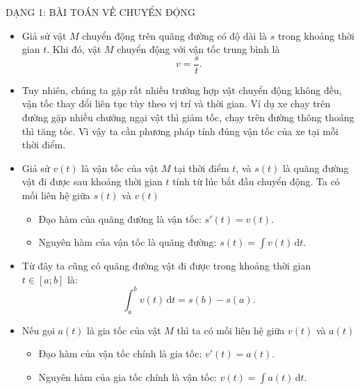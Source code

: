 \documentclass[12pt,a4paper]{article}
\newcommand{\dd}{\,\mathrm{d}}
\begin{document}
\begin{dangbox}DẠNG 1: BÀI TOÁN VỀ CHUYỂN ĐỘNG\end{dangbox}

\begin{itemize}
\item Giả sử vật $M$ chuyển động trên quãng đường có độ dài là $s$ trong khoảng thời gian $t$.
Khi đó, vật $M$ chuyển động với vận tốc trung bình là
\[
v=\frac{s}{t}.
\]
\item Tuy nhiên, chúng ta gặp rất nhiều trường hợp vật chuyển động không đều, vận tốc thay
đổi liên tục tùy theo vị trí và thời gian. Ví dụ xe chạy trên đường gặp nhiều chướng
ngại vật thì giảm tốc, chạy trên đường thông thoáng thì tăng tốc. Vì vậy ta cần phương
pháp tính đúng vận tốc của xe tại mỗi thời điểm.
\item Giả sử $v(t)$ là vận tốc của vật $M$ tại thời điểm $t$, và $s(t)$ là quãng đường vật đi được sau
khoảng thời gian $t$ tính từ lúc bắt đầu chuyển động. Ta có mối liên hệ giữa $s(t)$ và $v(t)$
\begin{itemize}
\item Đạo hàm của quãng đường là vận tốc: $s'(t)=v(t)$.
\item Nguyên hàm của vận tốc là quãng đường: $s(t)=\int v(t)\dd t$.
\end{itemize}
\item Từ đây ta cũng có quãng đường vật đi được trong khoảng thời gian $t\in[a;b]$ là:
\[
\int_a^b v(t)\dd t=s(b)-s(a).
\]
\item Nếu gọi $a(t)$ là gia tốc của vật $M$ thì ta có mối liên hệ giữa $v(t)$ và $a(t)$
\begin{itemize}
\item Đạo hàm của vận tốc chính là gia tốc: $v'(t)=a(t)$.
\item Nguyên hàm của gia tốc chính là vận tốc: $v(t)=\int a(t)\dd t$.
\end{itemize}
\end{itemize}
\end{document}
